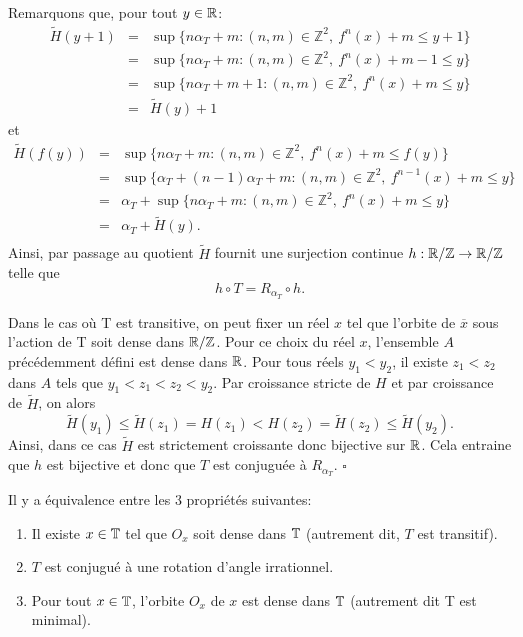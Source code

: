 	\par Remarquons que, pour tout $y \in {\mathbb{R}}$:
		\begin{eqnarray*}
			\widetilde{H}(y+1)&=&\sup \lbrace n \alpha_T +m: (n,m)\in \mathbb{Z}^2,\ f^n(x)+m\leq y+1 \rbrace\\
			&=& \sup \lbrace n \alpha_T +m: (n,m)\in \mathbb{Z}^2,\ f^n(x)+m-1\leq y\rbrace\\
			&=&\sup \lbrace n \alpha_T +m+1: (n,m)\in \mathbb{Z}^2,\ f^n(x)+m\leq y \rbrace \\
			&=&\widetilde{H}(y)+1
		\end{eqnarray*}
	et
		\begin{eqnarray*}
			\widetilde{H}(f(y))&=& \sup \lbrace n \alpha_T + m : (n,m)\in \mathbb{Z}^2,\ f^n(x)+m \leq f(y) \rbrace \\
		     &=& \sup \lbrace \alpha_T + (n-1) \alpha_T + m : (n,m)\in \mathbb{Z}^2,\ f^{n-1}(x)+m \leq y \rbrace \\
		     &=& \alpha_T + \sup \lbrace n \alpha_T + m : (n,m)\in \mathbb{Z}^2,\ f^{n}(x)+m \leq y \rbrace\\
		     &=&\alpha_T + \widetilde{H}(y). \\
		\end{eqnarray*}
	Ainsi, par passage au quotient $\widetilde{H}$ fournit une surjection continue $h: {\mathbb{R}}/\mathbb{Z}\to{\mathbb{R}}/\mathbb{Z}$ telle que
	$$h\circ T=R_{\alpha_T} \circ h.$$

	\par Dans le cas où T est transitive, on peut fixer un réel $x$ tel que l'orbite de $\overline{x}$ sous l'action de T soit dense dans ${\mathbb{R}}/\mathbb{Z}$. Pour ce choix du réel $x$, l'ensemble $A$ précédemment défini est dense dans ${\mathbb{R}}$. Pour tous réels $y_1<y_2$, il existe $z_1<z_2$ dans $A$ tels que $y_1<z_1<z_2<y_2$. Par croissance stricte de $H$ et par croissance de $\widetilde{H}$, on alors $$\widetilde{H}(y_1)\leq \widetilde{H}(z_1)=H(z_1)<H(z_2)=\widetilde{H}(z_2)\leq \widetilde{H}(y_2).$$
	Ainsi, dans ce cas $\widetilde{H}$ est strictement croissante donc bijective sur ${\mathbb{R}}$. Cela entraine que $h$ est bijective et donc que $T$ est conjuguée à $R_{\alpha_T}$. \hfill $\square$\\






\begin{corollary}\label{minimal équivaut transitif}
	Il y a équivalence entre les 3 propriétés suivantes:
	\begin{enumerate}
		\item Il existe $x\in {\mathbb{T}}$ tel que $O_x$ soit dense dans ${\mathbb{T}}$ (autrement dit, $T$ est transitif).
		\item $T$ est conjugué à une rotation d'angle irrationnel.
		\item Pour tout $x\in {\mathbb{T}}$, l'orbite $O_x$ de $x$ est dense dans ${\mathbb{T}}$ (autrement dit T est minimal).
	\end{enumerate}
\end{corollary}

